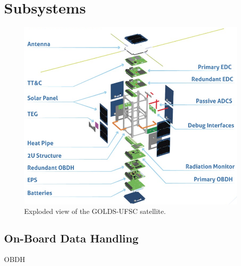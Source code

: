 %
%
%
%
%

%
%
%
%
%
%

\chapter{Subsystems} \label{ch:subsystems}

\begin{figure}[!ht]
    \begin{center}
        \includegraphics[width=\textwidth]{figures/exploded-view}
        \caption{Exploded view of the GOLDS-UFSC satellite.}
        \label{fig:exploded-view}
    \end{center}
\end{figure}

\section{On-Board Data Handling}

OBDH \cite{obdh2}

